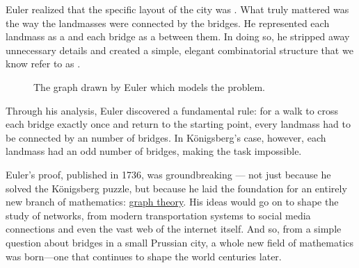 \documentclass[a4paper, 12pt]{report}
\begin{document}
    Euler realized that the specific layout of the city was . What truly mattered was the way the landmasses were connected by the bridges. He represented each landmass as a  and each bridge as a  between them. In doing so, he stripped away unnecessary details and created a simple, elegant combinatorial structure that we know refer to as .

    \begin{figure}[H]
        \centering
        \caption{The graph drawn by Euler which models the  problem.}
        \label{konigsberg}
    \end{figure}

    Through his analysis, Euler discovered a fundamental rule: for a walk to cross each bridge exactly once and return to the starting point, every landmass had to be connected by an  number of bridges. In Königsberg's case, however, each landmass had an odd number of bridges, making the task impossible.

    Euler's proof, published in 1736, was groundbreaking --- not just because he solved the Königsberg puzzle, but because he laid the foundation for an entirely new branch of mathematics: \href{https://en.wikipedia.org/wiki/Graph_theory}{graph theory}. His ideas would go on to shape the study of networks, from modern transportation systems to social media connections and even the vast web of the internet itself. And so, from a simple question about bridges in a small Prussian city, a whole new field of mathematics was born—one that continues to shape the world centuries later.
\end{document}
